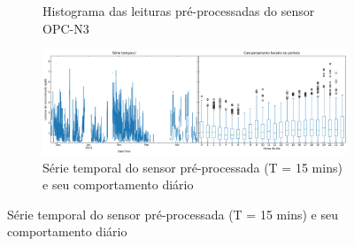 \begin{figure}[h]
\begin{subfigure}{0.495\textwidth}
        \caption{Histograma das leituras pré-processadas do sensor OPC-N3}
        \label{fig:data-pm10-preproc-hist}
    \end{subfigure}
    \begin{subfigure}{0.99\textwidth}
        \includegraphics[width=\textwidth]{chapters/3-RESULTADOS CAMPO/Figuras/preproc-pm10.png}
        \caption{Série temporal do sensor pré-processada (T = 15 mins) e seu comportamento diário}
        \label{fig:data-pm10-preproc-15}
    \end{subfigure}
    \hfill
    \label{fig:data-pm10-15}
\end{figure}

